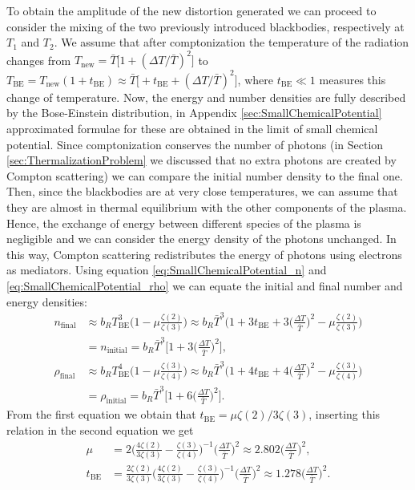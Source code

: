 To obtain the amplitude of the new distortion generated we can proceed to consider the mixing of the two previously introduced blackbodies, respectively at $T_1$ and $T_2$. We assume that after comptonization the temperature of the radiation changes from $T_\text{new}=\bar T\big[1+(\Delta T/\bar T)^2\big]$ to $T_\text{BE}=T_\text{new}(1+t_\text{BE})\approx\bar T\big[+t_\text{BE}+(\Delta T/\bar T)^2\big]$, where $t_\text{BE}\ll1$ measures this change of temperature. 
Now, the energy and number densities are fully described by the Bose-Einstein distribution, in Appendix \ref{sec:SmallChemicalPotential} approximated formulae for these are obtained in the limit of small chemical potential. Since comptonization conserves the number of photons (in Section \ref{sec:ThermalizationProblem} we discussed that no extra photons are created by Compton scattering) we can compare the initial number density to the final one. Then, since the blackbodies are at very close temperatures, we can assume that they are almost in thermal equilibrium with the other components of the plasma. Hence, the exchange of energy between different species of the plasma is negligible and we can consider the energy density of the photons unchanged. In this way, Compton scattering redistributes the energy of photons using electrons as mediators. Using equation \eqref{eq:SmallChemicalPotential_n} and \eqref{eq:SmallChemicalPotential_rho} we can equate the initial and final number and energy densities:
\begin{align*}
    n_\text{final}&\approx b_R T^3_\text{BE}\bigg(1-\mu\frac{\zeta(2)}{\zeta(3)}\bigg)\approx b_R \bar T^3\bigg(1+3t_\text{BE}+3\bigg(\frac{\Delta T}{\bar T}\bigg)^2-\mu\frac{\zeta(2)}{\zeta(3)}\bigg)\\
    &=n_\text{initial}=b_R\bar T^3\bigg[1+3\bigg(\frac{\Delta T}{\bar T}\bigg)^2\bigg],\\
    \rho_\text{final}&\approx b_R T^4_\text{BE}\bigg(1-\mu\frac{\zeta(3)}{\zeta(4)}\bigg)\approx b_R \bar T^3\bigg(1+4t_\text{BE}+4\bigg(\frac{\Delta T}{\bar T}\bigg)^2-\mu\frac{\zeta(3)}{\zeta(4)}\bigg)\\
    &=\rho_\text{initial}=b_R\bar T^3\bigg[1+6\bigg(\frac{\Delta T}{\bar T}\bigg)^2\bigg].
\end{align*}
From the first equation we obtain that $t_\text{BE}= \mu{\zeta(2)}/{3\zeta(3)}$, inserting this relation in the second equation we get
\begin{align}
    \mu&=2\bigg(\frac{4\zeta(2)}{3\zeta(3)}-\frac{\zeta(3)}{\zeta(4)}\bigg)^{-1}\bigg(\frac{\Delta T}{\bar T}\bigg)^2\approx2.802\bigg(\frac{\Delta T}{\bar T}\bigg)^2,\label{eq:mu_MixingBB}\\
    t_\text{BE}&=\frac{2\zeta(2)}{3\zeta(3)}\bigg(\frac{4\zeta(2)}{3\zeta(3)}-\frac{\zeta(3)}{\zeta(4)}\bigg)^{-1}\bigg(\frac{\Delta T}{\bar T}\bigg)^2\approx1.278\bigg(\frac{\Delta T}{\bar T}\bigg)^2.\label{eq:t_BE_MixingBB}
\end{align}
